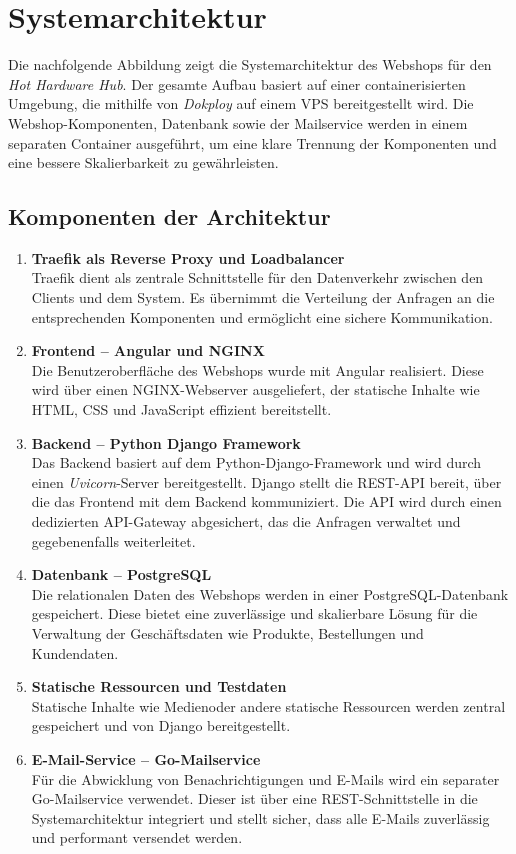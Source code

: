\documentclass[%
	12pt,
	a4paper,
	oneside,
	parskip=full
]{scrbook}
\begin{document}
\chapter{Systemarchitektur}
Die nachfolgende Abbildung zeigt die Systemarchitektur des Webshops für den \textit{Hot Hardware Hub}. Der gesamte Aufbau basiert auf einer containerisierten Umgebung, die mithilfe von \textit{Dokploy} auf einem VPS bereitgestellt wird. Die Webshop-Komponenten, Datenbank sowie der Mailservice werden in einem separaten Container ausgeführt, um eine klare Trennung der Komponenten und eine bessere Skalierbarkeit zu gewährleisten.

\section{Komponenten der Architektur}
\begin{enumerate}
	\item \textbf{Traefik als Reverse Proxy und Loadbalancer} \\
	Traefik dient als zentrale Schnittstelle für den Datenverkehr zwischen den Clients und dem System. Es übernimmt die Verteilung der Anfragen an die entsprechenden Komponenten und ermöglicht eine sichere Kommunikation.
	
	\item \textbf{Frontend – Angular und NGINX} \\
	Die Benutzeroberfläche des Webshops wurde mit Angular realisiert. Diese wird über einen NGINX-Webserver ausgeliefert, der statische Inhalte wie HTML, CSS und JavaScript effizient bereitstellt.
	
	\item \textbf{Backend – Python Django Framework} \\
	Das Backend basiert auf dem Python-Django-Framework und wird durch einen \textit{Uvicorn}-Server bereitgestellt. Django stellt die REST-API bereit, über die das Frontend mit dem Backend kommuniziert. Die API wird durch einen dedizierten API-Gateway abgesichert, das die Anfragen verwaltet und gegebenenfalls weiterleitet.
	
	\item \textbf{Datenbank – PostgreSQL} \\
	Die relationalen Daten des Webshops werden in einer PostgreSQL-Datenbank gespeichert. Diese bietet eine zuverlässige und skalierbare Lösung für die Verwaltung der Geschäftsdaten wie Produkte, Bestellungen und Kundendaten.
	
	\item \textbf{Statische Ressourcen und Testdaten} \\
	Statische Inhalte wie Medienoder andere statische Ressourcen werden zentral gespeichert und von Django bereitgestellt.
	
	\item \textbf{E-Mail-Service – Go-Mailservice} \\
	Für die Abwicklung von Benachrichtigungen und E-Mails wird ein separater Go-Mailservice verwendet. Dieser ist über eine REST-Schnittstelle in die Systemarchitektur integriert und stellt sicher, dass alle E-Mails zuverlässig und performant versendet werden.
\end{enumerate}
\end{document}
